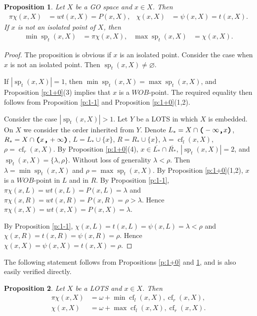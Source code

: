 \documentclass[preprint]{elsarticle}
\def\om{\omega}
\def\la{\lambda}
\def\cl#1{\overline{#1}}
\def\sp{\operatorname{sp}}
\def\es{\varnothing}
\def\sset#1{\{#1\}}
\newtheorem{proposition}{Proposition}[section]
\theoremstyle{definition}
\theoremstyle{remark}
\def\cf{\operatorname{cf}}
\def\wob/{$WOB$}
\def\lL(#1,#2){(-\infty,#1)}
\def\lR(#1,#2){(#1,+\infty)}
\def\ilcomma/{\boldsymbol{,}}
\def\ilsymlp{\boldsymbol{(}}
\def\ilsymrp{\boldsymbol{)}}
\def\ilfont#1{\boldsymbol{#1}}
\def\ilfontX#1{\mathrm{\text{\texttt{\textbf{\large #1}}}}}
\def\ilfontX#1{{\text{\texttt{\textbf{\large \upshape #1}}}}}
\def\ilfont#1{\raisebox{-1.2pt}{\ilfontX{#1}}}
\def\ilfontC#1{\raisebox{-0.7pt}{\ilfontX{#1}}}
\def\ilcomma/{\ilfontC{,}}
\def\ilsymlp{\ilfont{(}}
\def\ilsymrp{\ilfont{)}}
\def\ilpp(#1,#2){\ilsymlp#1\ilcomma/ #2\ilsymrp}
\def\lL(#1,#2){\ilpp(-\infty, #1)}
\def\lR(#1,#2){\ilpp(#1, +\infty)}
\begin{document}
\begin{proposition}\label{p:1+1}
Let $X$ be a GO space and $x\in X$.
Then  
\begin{align*}
\pi\chi(x,X) &= wt(x,X)= P(x,X),
&
\chi(x,X) &= \psi(x,X) = t(x,X).
\end{align*}
If $x$ is not an isolated point of $X$, then
\begin{align*}
\min \sp_t(x,X) &= \pi\chi(x,X),
&
\max \sp_t(x,X) &= \chi(x,X).
\end{align*}

\end{proposition}
\begin{proof}
The proposition is obvious if $x$ is an isolated point. Consider the case when $x$ is not an isolated point. Then $\sp_t(x,X)\neq\es$.

If $|\sp_t(x,X)|=1$, then $\min \sp_t(x,X)=\max \sp_t(x,X)$, and Proposition \ref{p:1+0}(3) implies that $x$ is a \wob/-point. The required equality then follows from Proposition \ref{p:1-1} and Proposition \ref{p:1+0}(1,2).

Consider the case $|\sp_t(x,X)|>1$.
Let $Y$ be a LOTS in which $X$ is embedded.
On $X$ we consider the order inherited from $Y$.
Denote $L_*=X\cap \lL(x,Y)$, $R_*=X\cap \lR(x,Y)$, $L=L_*\cup \sset x$, $R=R_*\cup \sset x$, $\la=\cf_l(x,X)$, $\rho=\cf_r(x,X)$.
By Proposition \ref{p:1+0}(4), $x\in \cl{L_*}\cap \cl{R_*}$, $|\sp_t(x,X)|=2$, and $\sp_t(x,X)=\sset{\la,\rho}$. Without loss of generality $\la<\rho$. Then $\la=\min \sp_t(x,X)$ and $\rho=\max \sp_t(x,X)$. By Proposition \ref{p:1+0}(1,2), $x$ is a \wob/-point in $L$ and in $R$.
By Proposition \ref{p:1-1}, $\pi\chi(x,L) = wt(x,L)= P(x,L)=\la$ and $\pi\chi(x,R) = wt(x,R)= P(x,R)=\rho>\la$. Hence $\pi\chi(x,X) = wt(x,X)= P(x,X)=\la$.

By Proposition \ref{p:1-1}, $\chi(x,L) = t(x,L)= \psi(x,L)=\la<\rho$ and $\chi(x,R) = t(x,R)= \psi(x,R)=\rho$. Hence $\chi(x,X)= \psi(x,X) = t(x,X) = \rho$.
\end{proof}

The following statement follows from Propositions \ref{p:1+0} and \ref{p:1+1}, and is also easily verified directly.

\begin{proposition}\label{p:1+1.5}
Let $X$ be a LOTS and $x\in X$. Then
\begin{align*}
\pi\chi(x,X) &= \om + \min \cf_l(x,X), \cf_r(x,X),
\\
\chi(x,X) &=  \om + \max \cf_l(x,X), \cf_r(x,X).
\end{align*}
\end{proposition}
\end{document}
